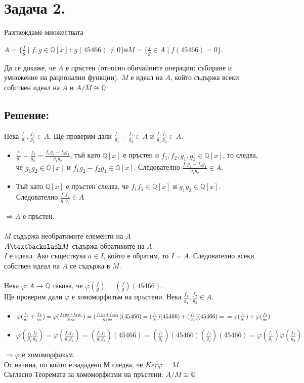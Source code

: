 \documentclass[10pt]{article}
\newcommand*{\Q}{\mathbb{Q}}
\begin{document}
\section*{Задача 2.}
Разглеждаме множествата
\begin{center}
	$A = \{\frac{f}{g} \mid f, g \in \Q[x] \,;\, g(45466) \neq 0\}$\quad и\quad$M = \{\frac{f}{g} \in A \mid f(45466) = 0\}$.
\end{center}
Да се докаже, че $A$ е пръстен (относно обичайните операции: събиране и умножение на рационални
функции), $M$ е идеал на $A$, който съдържа всеки собствен идеал на $A$ и $A/M \cong \Q$
\subsection*{Решение:}
Нека $\frac{f_1}{g_1}, \frac{f_2}{g_2} \in A$.
Ще проверим дали $\frac{f_1}{g_1} - \frac{f_2}{g_2} \in A$ и $\frac{f_1}{g_1}\frac{f_2}{g_2} \in A$.\\
\begin{itemize}
	\item $\frac{f_1}{g_1} - \frac{f_2}{g_2} = \frac{f_1g_2 - f_2g_1}{g_1g_2}$, тъй като $\Q[x]$ е пръстен и $f_1, f_2, g_1, g_2 \in \Q[x]$, то следва, че $g_1g_2 \in \Q[x]$ и $f_1g_2 - f_2g_1 \in \Q[x]$. Следователно $\frac{f_1g_2 - f_2g_1}{g_1g_2} \in A$.
	\item Тъй като $\Q[x]$ е пръстен следва, че $f_1f_2 \in \Q[x]$ и $g_1g_2 \in \Q[x]$. Следователно $\frac{f_1f_2}{g_1g_2} \in A$
\end{itemize}
$\Rightarrow A$ е пръстен.\\
\\
$M$ съдържа необратимите елементи на $A$\\
$A\textbackslash M$ съдържа обратимите на $A$.\\
$I$ е идеал. Ако съществува $a \in I$, който е обратим, то $I = A$. Следователно всеки собствен идеал на $A$ се съдържа в $M$.\\
\\
Нека $\varphi: A \to \Q$ такова, че $\varphi(\frac{f}{g}) = (\frac{f}{g})(45466)$.\\
Ще проверим дали $\varphi$ е хомоморфизъм на пръстени. Нека $\frac{f_1}{g_1}, \frac{f_2}{g_2} \in A$.
\begin{itemize}
	\item $\varphi(\frac{f_1}{g_1} + \frac{f_2}{g_2}) = \varphi(\frac{f_1g_2 + f_2g_1}{g_1g_2}) = (\frac{f_1g_2 + f_2g_1}{g_1g_2})(45466) = (\frac{f_1}{g_1})(45466) + (\frac{f_2}{g_2})(45466) = \\ = \varphi(\frac{f_1}{g_1}) + \varphi(\frac{f_2}{g_2})$
	\item $\varphi(\frac{f_1}{g_1}\frac{f_2}{g_2}) = \varphi(\frac{f_1f_2}{g_1g_2}) = (\frac{f_1f_2}{g_1g_2})(45466) = (\frac{f_1}{g_1})(45466)(\frac{f_2}{g_2})(45466) = \varphi(\frac{f_1}{g_1})\varphi(\frac{f_2}{g_2})$
\end{itemize}
$\Rightarrow \varphi$ е хомоморфизъм.\\
От начина, по който е зададено $М$ следва, че $Ker\varphi = M$.\\
Съгласно Теоремата за хомоморфизми на пръстени: $A/M \cong \Q$
\newpage
\end{document}

